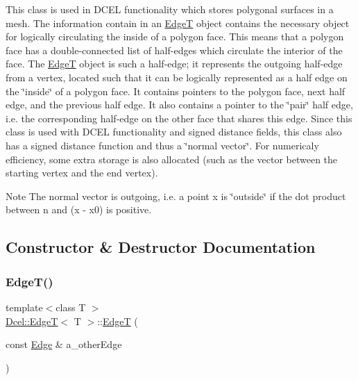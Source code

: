 This class is used in D\+C\+EL functionality which stores polygonal surfaces in a mesh. The information contain in an \hyperlink{classDcel_1_1EdgeT}{EdgeT} object contains the necessary object for logically circulating the inside of a polygon face. This means that a polygon face has a double-\/connected list of half-\/edges which circulate the interior of the face. The \hyperlink{classDcel_1_1EdgeT}{EdgeT} object is such a half-\/edge; it represents the outgoing half-\/edge from a vertex, located such that it can be logically represented as a half edge on the \char`\"{}inside\char`\"{} of a polygon face. It contains pointers to the polygon face, next half edge, and the previous half edge. It also contains a pointer to the \char`\"{}pair\char`\"{} half edge, i.\+e. the corresponding half-\/edge on the other face that shares this edge. Since this class is used with D\+C\+EL functionality and signed distance fields, this class also has a signed distance function and thus a \char`\"{}normal vector\char`\"{}. For numericaly efficiency, some extra storage is also allocated (such as the vector between the starting vertex and the end vertex). \begin{DoxyNote}{Note}
The normal vector is outgoing, i.\+e. a point x is \char`\"{}outside\char`\"{} if the dot product between n and (x -\/ x0) is positive. 
\end{DoxyNote}


\subsection{Constructor \& Destructor Documentation}
\mbox{\label{classDcel_1_1EdgeT_abe96b4404fa1961df79ffa618a7e8633}} 
\subsubsection{\texorpdfstring{Edge\+T()}{EdgeT()}\hspace{0.1cm}{\footnotesize\ttfamily [1/2]}}
{\footnotesize\ttfamily template$<$class T $>$ \\
\hyperlink{classDcel_1_1EdgeT}{Dcel\+::\+EdgeT}$<$ T $>$\+::\hyperlink{classDcel_1_1EdgeT}{EdgeT} (\begin{DoxyParamCaption}\item[{const \hyperlink{classDcel_1_1EdgeT_a00184663a9d069d2c7a7e0a970f71fd5}{Edge} \&}]{a\+\_\+other\+Edge }\end{DoxyParamCaption})\hspace{0.3cm}{\ttfamily [inline]}}



